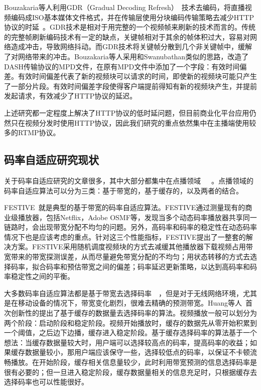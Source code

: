 Bouzakaria等人利用GDR（Gradual Decoding Refresh）~\cite{hannuksela2003random}技术去编码，将直播视频编码成ISO基本媒体文件格式，并在传输层使用分块编码传输策略去减少HTTP协议的时延~\cite{bouzakaria2014overhead}。GDR技术是相对于用完整的一个视频帧来刷新的技术而言的。传统的完整帧刷新编码技术有一定的缺点，关键帧相对于其余的帧体积过大，容易对网络造成冲击，导致网络抖动。而GDR技术将关键帧分散到几个非关键帧中，缓解了对网络带来的冲击。Bouzakaria等人采用和Swanubathan类似的思路，改造了DASH传输协议的MPD文件，在原有MPD文件中添加了一个字段：有效时间偏差。有效时间偏差代表了新的视频块可以请求的时间，即使新的视频块可能只产生了一部分片段。有效时间偏差字段使得客户端提前得知有新的视频块产生，并提前发起请求，有效减少了HTTP协议的延迟。

上述研究都一定程度上解决了HTTP协议的低时延问题，但目前商业化平台应用仍然只在视频分发时使用HTTP协议，因此我们研究的重点依然集中在主播端使用较多的RTMP协议。

\subsection{码率自适应研究现状}
关于码率自适应研究的文章很多，其中大部分都集中在点播领域~\cite{mao2017neural}~\cite{akhshabi2011experimental}~\cite{petrangeli2016qoe}。点播领域的码率自适应算法可以分为三类：基于带宽的，基于缓存的，以及两者的结合。

FESTIVE~\cite{jiang2014improving}就是典型的基于带宽的码率自适应算法。FESTIVE通过测量现有的商业级播放器，包括Netflix，Adobe OSMF等，发现当多个动态码率播放器共享同一链路时，会出现带宽分配不均匀的问题。另外，高码率和码率的稳定性在动态码率情况下也是应该考虑的重点。针对这三个性能指标，FESTIVE提出了一整套的解决方案。FESTIVE采用随机调度视频块的方式去减缓其他播放器下载视频占用带宽带来的带宽探测误差，从而尽量避免带宽分配的不均匀；用状态转移的方式去选择码率，拟合码率和预估带宽之间的偏差；码率延迟更新策略，以达到高码率和码率稳定性之间的平衡。

大多数码率自适应算法都是基于带宽去选择码率~\cite{li2014probe}~\cite{akhshabi2012happens}，但是对于无线网络环境，尤其是在移动设备的情况下，带宽变化剧烈，很难去精确的预测带宽。Huang等人~\cite{huang2015buffer}首次创新性的提出了基于缓存的数据量去选择码率的算法。视频播放一般可以划分为两个阶段：启动阶段和稳定阶段。视频开始播放时，缓存的数据先从零开始积累到一个阈值，之后边下边播，缓存进入稳定阶段。基于缓存选择码率的算法基于一个想法：当缓存数据量较大时，用户端可以选择较高点的码率，提高码率的收益；如果缓存数据量较小，那用户端应该保守一些，选择较低点的码率，以保证不卡顿流畅播放。在开始阶段，缓存相关信息量较少，此时利用带宽预测的信息选择码率是很有必要的；但一旦进入稳定阶段，缓存数据量相关的信息充足时，只根据缓存去选择码率也可以性能很好。

